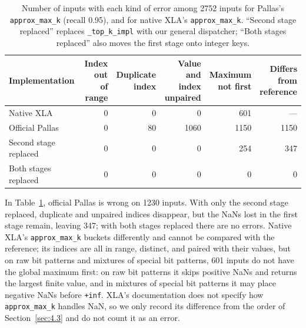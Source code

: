 \documentclass[sigconf,nonacm,balance=false]{acmart}
\newcommand{\code}[1]{\texttt{#1}}
\begin{document}
\begin{table}
\centering
\caption{Number of inputs with each kind of error among 2752 inputs for Pallas's \code{approx\_\allowbreak{}max\_\allowbreak{}k} (recall 0.95), and for native XLA's \code{approx\_\allowbreak{}max\_\allowbreak{}k}. ``Second stage replaced'' replaces \code{\_\allowbreak{}top\_\allowbreak{}k\_\allowbreak{}impl} with our general dispatcher; ``Both stages replaced'' also moves the first stage onto integer keys.}
\label{tab:20}
\begin{tabular}{lrrrrr}
\toprule
Implementation & \makecell[rb]{Index out\\of range} & \makecell[rb]{Duplicate\\index} & \makecell[rb]{Value and\\index\\unpaired} & \makecell[rb]{Maximum\\not first} & \makecell[rb]{Differs\\from\\reference} \\
\midrule
Native XLA & 0 & 0 & 0 & 601 & --- \\
Official Pallas & 0 & 80 & 1060 & 1150 & 1150 \\
Second stage replaced & 0 & 0 & 0 & 254 & 347 \\
Both stages replaced & 0 & 0 & 0 & 0 & 0 \\
\bottomrule
\end{tabular}
\end{table}

In Table~\ref{tab:20}, official Pallas is wrong on 1230 inputs. With only the second stage replaced, duplicate and unpaired indices disappear, but the NaNs lost in the first stage remain, leaving 347; with both stages replaced there are no errors. Native XLA's \code{approx\_\allowbreak{}max\_\allowbreak{}k} buckets differently and cannot be compared with the reference; its indices are all in range, distinct, and paired with their values, but on raw bit patterns and mixtures of special bit patterns, 601 inputs do not have the global maximum first: on raw bit patterns it skips positive NaNs and returns the largest finite value, and in mixtures of special bit patterns it may place negative NaNs before \code{+inf}. XLA's documentation does not specify how \code{approx\_\allowbreak{}max\_\allowbreak{}k} handles NaN, so we only record its difference from the order of Section~\ref{sec:4.3} and do not count it as an error.
\end{document}
